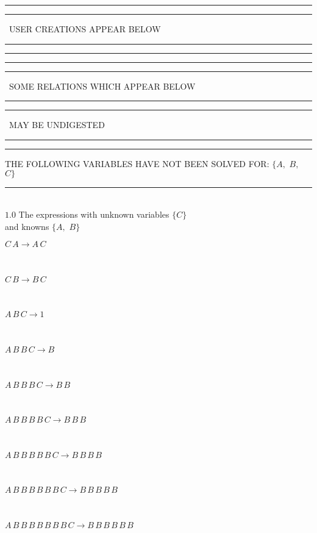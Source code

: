 \documentclass[rep10,leqno]{report}
\begin{document}
\rule[2pt]{6in}{1pt}\hfil\break
\rule[2.5pt]{1.701in}{1pt}
\ USER CREATIONS APPEAR BELOW\ 
\rule[2.5pt]{1.701in}{1pt}\hfil\break
\rule[2pt]{6in}{1pt}\hfil\break
\rule[2pt]{6in}{4pt}\hfil\break
\rule[2pt]{1.45in}{4pt}
\ SOME RELATIONS WHICH APPEAR BELOW\ 
\rule[2pt]{1.45in}{4pt}\hfil\break
\rule[2pt]{2.18in}{4pt}
\ MAY BE UNDIGESTED\ 
\rule[2pt]{2.18in}{4pt}\hfil\break
\rule[2pt]{6in}{4pt}\hfil\break
THE FOLLOWING VARIABLES HAVE NOT BEEN SOLVED FOR:\hfil\break
$\{A,
$ $
B,
$ $
C\}$
\smallskip\\
\rule[3pt]{6in}{.7pt}\\
$1.0$  The expressions with unknown variables $\{C\}$\\
and knowns $\{A,
$ $
B\}$\smallskip\\
\begin{minipage}{6in}
$
C\,
 A\rightarrow A\,
 C
$
\end{minipage}\medskip \\
\begin{minipage}{6in}
$
C\,
 B\rightarrow B\,
 C
$
\end{minipage}\medskip \\
\begin{minipage}{6in}
$
A\,
 B\,
 C\rightarrow 1
$
\end{minipage}\medskip \\
\begin{minipage}{6in}
$
A\,
 B\,
 B\,
 C\rightarrow B
$
\end{minipage}\medskip \\
\begin{minipage}{6in}
$
A\,
 B\,
 B\,
 B\,
 C\rightarrow B\,
 B
$
\end{minipage}\medskip \\
\begin{minipage}{6in}
$
A\,
 B\,
 B\,
 B\,
 B\,
 C\rightarrow B\,
 B\,
 B
$
\end{minipage}\medskip \\
\begin{minipage}{6in}
$
A\,
 B\,
 B\,
 B\,
 B\,
 B\,
 C\rightarrow B\,
 B\,
 B\,
 B
$
\end{minipage}\medskip \\
\begin{minipage}{6in}
$
A\,
 B\,
 B\,
 B\,
 B\,
 B\,
 B\,
 C\rightarrow B\,
 B\,
 B\,
 B\,
 B
$
\end{minipage}\medskip \\
\begin{minipage}{6in}
$
A\,
 B\,
 B\,
 B\,
 B\,
 B\,
 B\,
 B\,
 C\rightarrow B\,
 B\,
 B\,
 B\,
 B\,
 B
$
\end{minipage}\\
\vspace{10pt}
\end{document}
